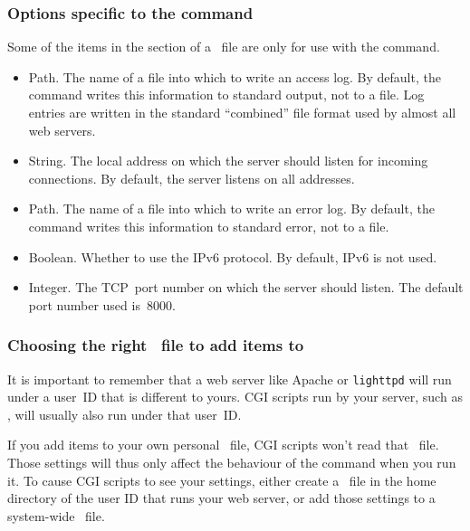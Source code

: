 \subsubsection{Options specific to the  command}

Some of the items in the  section of a \hgrc\ file are
only for use with the  command.
\begin{itemize}
\item[\rcitem{web}{accesslog}] Path.  The name of a file into which to
  write an access log.  By default, the  command writes
  this information to standard output, not to a file.  Log entries are
  written in the standard ``combined'' file format used by almost all
  web servers.
\item[\rcitem{web}{address}] String.  The local address on which the
  server should listen for incoming connections.  By default, the
  server listens on all addresses.
\item[\rcitem{web}{errorlog}] Path.  The name of a file into which to
  write an error log.  By default, the  command writes this
  information to standard error, not to a file.
\item[\rcitem{web}{ipv6}] Boolean.  Whether to use the IPv6 protocol.
  By default, IPv6 is not used. 
\item[\rcitem{web}{port}] Integer.  The TCP~port number on which the
  server should listen.  The default port number used is~8000.
\end{itemize}

\subsubsection{Choosing the right \hgrc\ file to add  items to}

It is important to remember that a web server like Apache or
\texttt{lighttpd} will run under a user~ID that is different to yours.
CGI scripts run by your server, such as , will
usually also run under that user~ID.

If you add  items to your own personal \hgrc\ file, CGI
scripts won't read that \hgrc\ file.  Those settings will thus only
affect the behaviour of the  command when you run it.  To
cause CGI scripts to see your settings, either create a \hgrc\ file in
the home directory of the user ID that runs your web server, or add
those settings to a system-wide \hgrc\ file.


